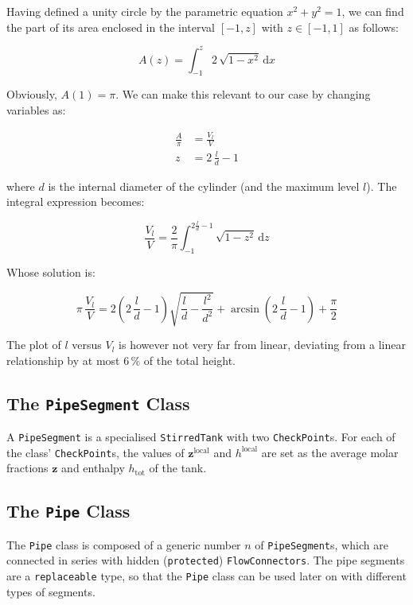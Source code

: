 \documentclass[a4paper]{article}
\renewcommand{\d}{\ensuremath{\mathrm{d}}}
\begin{document}
Having defined a unity circle by the parametric equation $x^2+y^2=1$, we can
find the part of its area enclosed in the interval $[-1,z]$ with $z \in [-1,1]$
as follows:

\begin{equation}
A(z) = \int_{-1}^z 2 \, \sqrt{1-x^2} \, \d x
\end{equation}

Obviously, $A(1) = \pi$. We can make this relevant to our case by changing
variables as:

\begin{align}
\frac{A}{\pi} &= \frac{V_l}{V}\\
z &= 2\,\frac{l}{d}-1
\end{align}

where $d$ is the internal diameter of the cylinder (and the maximum level $l$).
The integral expression becomes:

\begin{equation}
\frac{V_l}{V} = \frac{2}{\pi} \int_{-1}^{2\frac{l}{d}-1} \sqrt{1-z^2} \, \d z
\end{equation}

Whose solution is:

\begin{equation}
\pi \, \frac{V_l}{V} = 2 \left(2\,\frac{l}{d} -1 \right)\sqrt{\frac{l}{d}-
\frac{l^2}{d^2}} + \arcsin\left(2\,\frac{l}{d} -1 \right) + \frac{\pi}{2}
\end{equation}

The plot of $l$ versus $V_l$ is however not very far from linear, deviating from
a linear relationship by at most 6\,\% of the total height.


\subsection{The \texttt{PipeSegment} Class}
A \texttt{PipeSegment} is a specialised \texttt{StirredTank} with two
\texttt{CheckPoint}s. For each of the class' \texttt{CheckPoint}s, the values
of $\mathbf{z}^\text{local}$ and $h^\text{local}$ are set as the average molar
fractions $\mathbf{z}$ and enthalpy $h_\text{tot}$ of the tank.


\subsection{The \texttt{Pipe} Class}
The \texttt{Pipe} class is composed of a generic number $n$ of
\texttt{PipeSegment}s, which are connected in series with hidden
(\texttt{protected}) \texttt{FlowConnectors}. The pipe segments are a
\texttt{replaceable} type, so that the \texttt{Pipe} class can be used later on
with different types of segments.
\end{document}

